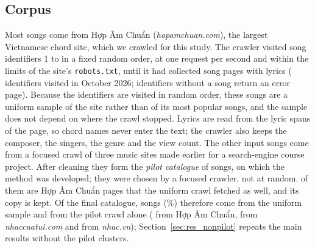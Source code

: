 \documentclass[11pt]{article}
\newcommand{\vi}[1]{\textit{#1}}          %
\begin{document}
\subsection{Corpus}\label{sec:corpus}
Most songs come from Hợp Âm Chuẩn (\vi{hopamchuan.com}), the largest Vietnamese chord site, which we
crawled for this study. The crawler visited song identifiers 1 to \CrawlIdMax{} in a fixed random order,
at one request per second and within the limits of the site's \texttt{robots.txt}, until it had collected
\CrawlSongs{} song pages with lyrics (\CrawlPages{} identifiers visited in October 2026; identifiers without
a song return an error page). Because the identifiers are visited in random order, these songs are a uniform
sample of the site rather than of its most popular songs, and the sample does not depend on where the crawl
stopped. Lyrics are read from the lyric spans of the page, so chord names never enter the text; the crawler
also keeps the composer, the singers, the genre and the view count. The other \NCourseDB{} input songs come
from a focused crawl of three music sites made earlier for a search-engine course project. After cleaning
they form the \emph{pilot catalogue} of \NPilotSongs{} songs, on which the method was developed; they were
chosen by a focused crawler, not at random. \NPilotBoth{} of them are Hợp Âm Chuẩn pages that the uniform
crawl fetched as well, and its copy is kept. Of the final catalogue, \NUniform{} songs (\UniformShare\%)
therefore come from the uniform sample and \NOnlyPilot{} from the pilot crawl alone (\NOnlyPilotHac{} from
Hợp Âm Chuẩn, \NSrcNhaccuatui{} from \vi{nhaccuatui.com} and \NSrcNhac{} from \vi{nhac.vn});
Section~\ref{sec:res_nonpilot} repeats the main results without the pilot clusters.
\end{document}
